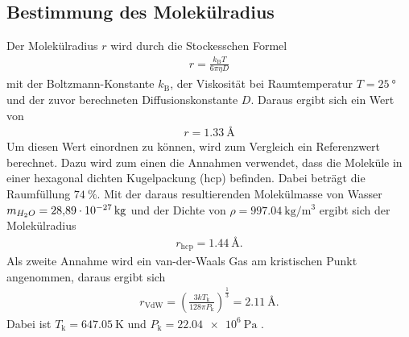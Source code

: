 \subsection{Bestimmung des Molekülradius}
Der Molekülradius $r$ wird durch die Stockesschen Formel
\begin{align*}
  r = \frac{k_\text{B} T}{6\pi\eta D}
\end{align*}
mit der Boltzmann-Konstante $k_\text{B}$, der Viskosität bei Raumtemperatur $T = \SI{25}{\degree}$
und der zuvor berechneten Diffusionskonstante $D$. Daraus ergibt sich ein Wert von
\begin{align*}
  r = \SI{1.33}{\angstrom}
\end{align*}
Um diesen Wert einordnen zu können, wird zum Vergleich ein Referenzwert berechnet.
Dazu wird zum einen die Annahmen verwendet, dass die Moleküle in einer
hexagonal dichten Kugelpackung (hcp) befinden. Dabei beträgt die Raumfüllung
$\SI{74}{\percent}$. Mit der daraus resultierenden Molekülmasse von Wasser
$m_{H_2O} = \SI{28.89d-27}{\kilo\gram}$ und der Dichte von
$\rho = \SI{997.04}{\kilo\gram\per\cubic\meter}$ \cite{hcp} ergibt sich der
Molekülradius
\begin{align*}
  r_\text{hcp} = \SI{1.44}{\angstrom}.
\end{align*}
Als zweite Annahme wird ein van-der-Waals Gas am kristischen Punkt angenommen,
daraus ergibt sich
\begin{align*}
  r_\text{VdW} = \left(\frac{3kT_\text{k}}{128\pi P_\text{k}}\right)^\frac{1}{3} = \SI{2.11}{\angstrom}.
\end{align*}
Dabei ist $T_\text{k} = \SI{647.05}{\kelvin}$ und $P_\text{k} = \SI{22.04e6}{\pascal}$ \cite{VdW}.




